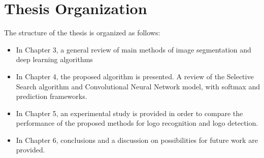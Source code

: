 \section{Thesis Organization}\label{sec:2.3}
\par The structure of the thesis is organized as follows:

\begin{itemize}
	\item  In Chapter 3, a general review of main methods of image segmentation and deep learning algorithms%
	\vspace{-0.3cm}
	\item In Chapter 4, the proposed algorithm is presented. A review of the Selective Search algorithm and Convolutional Neural Network model, with softmax and prediction frameworks.
	\vspace{-0.3cm}
	\item In Chapter 5, an experimental study is provided in order to compare the performance of the proposed methods for logo recognition and logo detection.
	\vspace{-0.3cm}
	\item In Chapter 6, conclusions and a discussion on possibilities for future work are provided.
\end{itemize}
